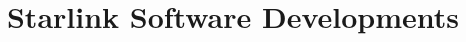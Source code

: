 \documentclass[11pt,twoside]{article}  %
\begin{document}

%
%
%


%
%
%
%

\title{Starlink Software Developments}

%
%
%
\end{document}
